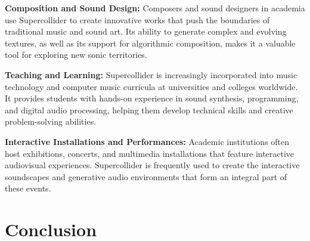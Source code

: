 \documentclass[a4paper]{book}
\begin{document}
\textbf{Composition and Sound Design:} Composers and sound designers in academia use Supercollider to create innovative works that push the boundaries of traditional music and sound art. Its ability to generate complex and evolving textures, as well as its support for algorithmic composition, makes it a valuable tool for exploring new sonic territories.

\textbf{Teaching and Learning:} Supercollider is increasingly incorporated into music technology and computer music curricula at universities and colleges worldwide. It provides students with hands-on experience in sound synthesis, programming, and digital audio processing, helping them develop technical skills and creative problem-solving abilities.

\textbf{Interactive Installations and Performances:} Academic institutions often host exhibitions, concerts, and multimedia installations that feature interactive audiovisual experiences. Supercollider is frequently used to create the interactive soundscapes and generative audio environments that form an integral part of these events.

\backmatter
\chapter{Conclusion}


\printbibliography
\end{document}
